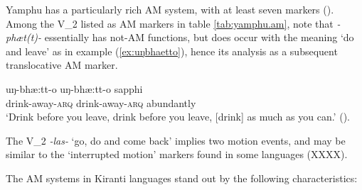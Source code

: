 \documentclass[oneside,a4paper,11pt]{article}
\newcommand{\ipa}[1]{{\phon\textit{#1}}}
\newcommand{\sens}[1]{‘#1’}
\begin{document}
Yamphu has a particularly rich AM system, with at least seven markers (\citealt[137-194]{rutgers98yamphu}). Among the V_2 listed as AM markers in table \ref{tab:yamphu.am}, note that \ipa{-phæt(t)-} essentially has not-AM functions, but does occur with the meaning `do and leave' as in example (\ref{ex:uŋbhaetto}), hence its analysis as a subsequent translocative AM marker.  
 
 \begin{exe}
\ex \label{ex:uŋbhaetto}
\gll uŋ-bhæ:tt-o uŋ-bhæ:tt-o sapphi \\
drink-away-\textsc{arq} drink-away-\textsc{arq}  abundantly\\
\glt \sens{Drink before you leave, drink before you leave, [drink] as much as you can.} (\citealt[150]{rutgers98yamphu}).
\end{exe}

The V_2 \ipa{-las-} `go, do and come back' implies two motion events, and may be similar to the `interrupted motion' markers found in some languages (XXXX).


The AM systems in Kiranti languages stand out by the following characteristics:
\end{document}
